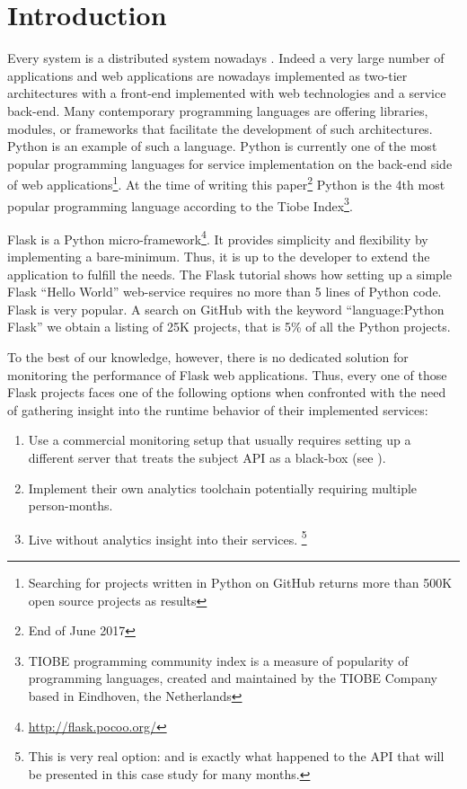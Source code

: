 \documentclass[conference]{IEEEtran}
\begin{document}
\section{Introduction}
Every system is a distributed system nowadays \cite{cavage2013there}. Indeed a very large number of applications and web applications are nowadays implemented as two-tier architectures with a front-end implemented with web technologies and a service back-end.
Many contemporary programming languages are offering libraries, modules, or frameworks that facilitate the development of such architectures. Python is an example of such a language. 
%
Python is currently one of the most popular programming languages for service implementation on the back-end side of web applications\footnote{Searching for projects written in Python on GitHub returns more than 500K open source projects as results}. At the time of writing this paper\footnote{End of June 2017} Python is the 4th most popular programming language according to the Tiobe Index\footnote{TIOBE programming community index is a measure of popularity of programming languages, created and maintained by the TIOBE Company based in Eindhoven, the Netherlands}. 

Flask is a Python micro-framework\footnote{\url{http://flask.pocoo.org/}}. It provides simplicity and flexibility by implementing a bare-minimum. Thus, it is up to the developer to extend the application to fulfill the needs. The Flask tutorial shows how setting up a simple Flask ``Hello World'' web-service requires no more than 5 lines of Python code. \cite{ flask:tutorial}
%
Flask is very popular. A search on GitHub with the keyword ``language:Python Flask'' we obtain a listing of 25K projects, that is 5\% of all the Python projects. 


To the best of our knowledge, however, there is no dedicated solution for monitoring the performance of Flask web applications. Thus, every one of those Flask projects faces one of the following options when confronted with the need of gathering insight into the runtime behavior of their implemented services: 

  \begin{enumerate}

    \item Use a commercial monitoring setup that usually requires setting up a different server that treats the subject API as a black-box (see ). 

    \item Implement their own analytics toolchain potentially requiring multiple person-months. 

    \item Live without analytics insight into their services. \footnote{This is very real option: and is exactly what happened to the API that will be presented in this case study for many months. }

  \end{enumerate}
\end{document}
